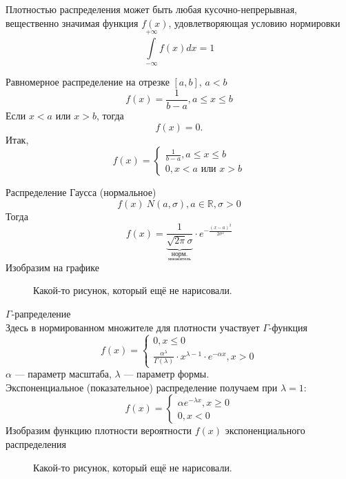 Плотностью распределения может быть любая кусочно-непрерывная, вещественно значимая функция $f(x)$, удовлетворяющая условию нормировки
\[
	\int\limits_{-\infty}^{+\infty} f(x) dx = 1
\]
\begin{example}
	Равномерное распределение на отрезке $[a, b]$, $a < b$
	\[
		f(x) = \frac{1}{b-a}, a \leqslant x \leqslant b
	\]
	Если $x < a$ или $x > b$, тогда
	\[
		f(x) = 0.
	\]
	Итак,
	\[
		f(x) =
		\begin{cases}
			\frac{1}{b-a}, a \leqslant x \leqslant b \\
			0, x < a \text{ или } x > b
		\end{cases}
	\]
\end{example}
\begin{example} Распределение Гаусса (нормальное)
	\[
		f(x) ~ N(a, \sigma), a \in \mathbb{R}, \sigma > 0
	\]
	Тогда
	\[
		f(x) = \underbrace{\frac{1}{\sqrt{2 \pi } \sigma}}_{\underset{\text{множитель}}{\text{норм.}}}\cdot e ^{-\frac{(x-a)^2}{2 \sigma^2}}
	\]
	Изобразим на графике
	\begin{figure}[ht] %
		\centering
		\def\svgwidth{16em}
		
		\caption{Какой-то рисунок, который ещё не нарисовали.}
	\end{figure}
\end{example}
\begin{example} $\Gamma$-рапределение \\
	Здесь в нормированном множителе для плотности участвует $\Gamma$-функция
	\[
		f(x) =
		\begin{cases}
			0, x \leqslant 0 \\
			\frac{\alpha^\lambda}{\Gamma(\lambda)} \cdot x^{\lambda - 1} \cdot e^{-\alpha x}, x > 0
		\end{cases}
	\]
	$\alpha$ --- параметр масштаба, $\lambda$ --- параметр формы. \\
	Экспоненциальное (показательное) распределение получаем при $\lambda = 1$:
	\[
		f(x) =
		\begin{cases}
			\alpha e^{-\lambda x}, x \geqslant 0 \\
			0, x < 0
		\end{cases}
	\]
	Изобразим функцию плотности вероятности $f(x)$ экспоненциального распределения
	\begin{figure}[ht] %
		\centering
		\def\svgwidth{16em}
		
		\caption{Какой-то рисунок, который ещё не нарисовали.}
	\end{figure}
\end{example}
